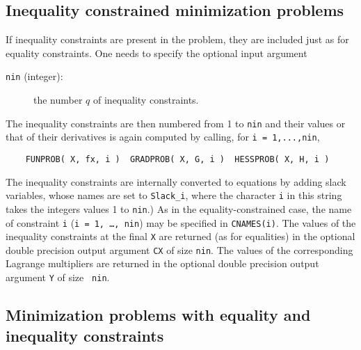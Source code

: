 \documentclass{article}
\begin{document}
\subsection{Inequality constrained minimization problems}

If inequality constraints are present in the problem, they are included
just as for equality constraints.  One needs to specify
the optional input argument
\begin{description}
\item[{\tt nin} (integer):] the number $q$ of inequality constraints.
\end{description}
The inequality constraints are then numbered from 1 to {\tt nin}
and their values or that of their derivatives is again computed by
calling, for  {\tt i = 1,...,nin},
\begin{lstlisting}
    FUNPROB( X, fx, i )  GRADPROB( X, G, i )  HESSPROB( X, H, i )
\end{lstlisting}
\noindent
The inequality constraints are internally converted to equations by
adding slack variables, whose names are set to {\tt Slack\_i}, where the
character {\tt i} in this string takes the integers values 1 to {\tt nin}.)
As in the equality-constrained case, the name of constraint {\tt i}
({\tt i = 1, \ldots, nin}) may be specified in {\tt CNAMES(i)}. The
values of the inequality constraints at the final {\tt X} are returned
(as for equalities) in the optional double precision output argument {\tt CX}
of size {\tt nin}. The values of the corresponding Lagrange multipliers are
returned in the optional double precision output argument {\tt Y} of size {\tt
nin}.

\subsection{Minimization problems with equality and inequality constraints}
\end{document}
